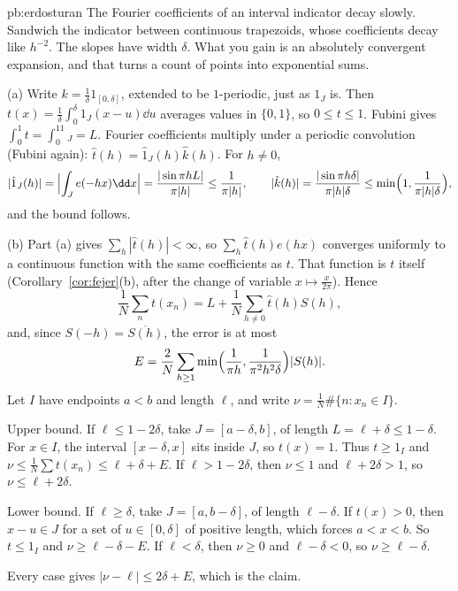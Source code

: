 \begin{solution}{pb:erdosturan}
\idea The Fourier coefficients of an interval indicator decay slowly. Sandwich the indicator between continuous trapezoids, whose
coefficients decay like $h^{-2}$. The slopes have width $\delta$. What you gain is an absolutely convergent expansion, and that
turns a count of points into exponential sums.

\writeup (a) Write $k=\frac1\delta1_{[0,\delta]}$, extended to be $1$-periodic, just as $1_J$ is. Then $t(x)=\frac1\delta\int_0^\delta1_J(x-u)\dd u$ averages values in
$\{0,1\}$, so $0\le t\le1$. Fubini gives $\int_0^1t=\int_0^11_J=L$. Fourier coefficients multiply under a periodic convolution (Fubini
again): $\hat t(h)=\hat1_J(h)\hat k(h)$. For $h\ne0$,
\[
|\hat1_J(h)|=\Bigl|\int_Je(-hx)\dd x\Bigr|=\frac{|\sin\pi hL|}{\pi|h|}\le\frac1{\pi|h|},\qquad|\hat k(h)|=\frac{|\sin\pi h\delta|}{\pi|h|\delta}\le\min\Bigl(1,\frac1{\pi|h|\delta}\Bigr),
\]
and the bound follows.

(b) Part (a) gives $\sum_h|\hat t(h)|<\infty$, so $\sum_h\hat t(h)e(hx)$ converges uniformly to a continuous function with the same coefficients as $t$. That function is
$t$ itself (Corollary~\ref{cor:fejer}(b), after the change of variable $x\mapsto\frac x{2\pi}$). Hence
\[
\frac1N\sum_nt(x_n)=L+\frac1N\sum_{h\ne0}\hat t(h)S(h),
\]
and, since $S(-h)=\overline{S(h)}$, the error is at most
\[
E=\frac2N\sum_{h\ge1}\min\Bigl(\frac1{\pi h},\frac1{\pi^2h^2\delta}\Bigr)|S(h)|.
\]
Let $I$ have endpoints $a<b$ and length $\ell$,
and write $\nu=\frac1N\#\{n:x_n\in I\}$.

Upper bound. If $\ell\le1-2\delta$, take $J=[a-\delta,b]$, of length $L=\ell+\delta\le1-\delta$. For $x\in I$, the interval $[x-\delta,x]$ sits inside $J$, so $t(x)=1$. Thus $t\ge1_I$
and $\nu\le\frac1N\sum t(x_n)\le\ell+\delta+E$. If $\ell>1-2\delta$, then $\nu\le1$ and $\ell+2\delta>1$, so $\nu\le\ell+2\delta$.

Lower bound. If $\ell\ge\delta$, take $J=[a,b-\delta]$, of length $\ell-\delta$. If $t(x)>0$, then $x-u\in J$ for a set of $u\in[0,\delta]$ of positive
length, which forces $a<x<b$. So $t\le1_I$ and $\nu\ge\ell-\delta-E$. If $\ell<\delta$, then $\nu\ge0$ and $\ell-\delta<0$, so $\nu\ge\ell-\delta$.

Every case gives $|\nu-\ell|\le2\delta+E$, which is the claim.


\end{solution}
